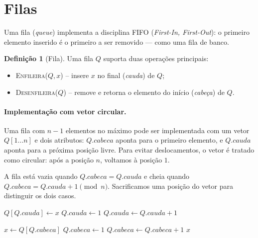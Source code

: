 \documentclass[9pt,a4paper]{extarticle}
\newcommand{\impt}[1]{\textcolor{important}{#1}}
\theoremstyle{definition}
\newtheorem{definition}{Definição}[section]
\begin{document}
\section{Filas}

Uma \impt{fila} (\emph{queue}) implementa a disciplina \impt{FIFO} (\emph{First-In, First-Out}): o primeiro elemento inserido é o primeiro a ser removido — como uma fila de banco.

\begin{definition}[Fila]
Uma fila $Q$ suporta duas operações principais:
\begin{itemize}
    \item \textsc{Enfileira}($Q, x$) -- insere $x$ no final (\emph{cauda}) de $Q$;
    \item \textsc{Desenfileira}($Q$) -- remove e retorna o elemento do início (\emph{cabeça}) de $Q$.
\end{itemize}
\end{definition}

\paragraph{Implementação com vetor circular.} Uma fila com $n-1$ elementos no máximo pode ser implementada com um vetor $Q[1 \ldots n]$ e dois atributos: $Q.\mathit{cabeca}$ aponta para o primeiro elemento, e $Q.\mathit{cauda}$ aponta para a próxima posição livre. Para evitar deslocamentos, o vetor é tratado como \impt{circular}: após a posição $n$, voltamos à posição $1$.

A fila está vazia quando $Q.\mathit{cabeca} = Q.\mathit{cauda}$ e cheia quando $Q.\mathit{cabeca} = Q.\mathit{cauda} + 1 \pmod n$. Sacrificamos uma posição do vetor para distinguir os dois casos.

\begin{algorithm}[H]
\caption{\textsc{Enfileira}($Q, x$)}
\begin{algorithmic}[1]
\State $Q[Q.\mathit{cauda}] \gets x$
    \State $Q.\mathit{cauda} \gets 1$
\Else
    \State $Q.\mathit{cauda} \gets Q.\mathit{cauda} + 1$
\EndIf
\end{algorithmic}
\end{algorithm}

\begin{algorithm}[H]
\caption{\textsc{Desenfileira}($Q$)}
\begin{algorithmic}[1]
\State $x \gets Q[Q.\mathit{cabeca}]$
    \State $Q.\mathit{cabeca} \gets 1$
\Else
    \State $Q.\mathit{cabeca} \gets Q.\mathit{cabeca} + 1$
\EndIf
\State \Return $x$
\end{algorithmic}
\end{algorithm}
\end{document}
